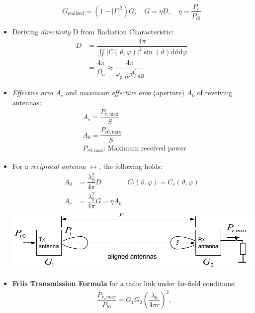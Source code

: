 \begin{itemize}
\begin{align*}
        \end{align*}
        \begin{equation*}
            G_{\mathrm{realized}} = (1 - |\Gamma|^2)G, \quad G = \eta D, \quad \eta = \dfrac{P_t}{P_{t0}}
        \end{equation*}
    \item Deriving \textit{directivity} D from Radiation Characteristic:\\
        \begin{align*}
            D &= \dfrac{4\pi}{\iint |C(\vartheta, \varphi)|^2 \sin(\vartheta) \mathrm{d}\vartheta\mathrm{d}\varphi}\\
            &= \dfrac{4\pi}{\Omega_a} \approx \dfrac{4\pi}{\varphi_{\SI{3}{dB}} \vartheta^\prime_{\SI{3}{dB}}}
        \end{align*}
    \item \textit{Effective area} $A_e$ and \textit{maximum effective area} (aperture) $A_0$ of reveiving antennas:\\
        \begin{align*}
            &A_e = \dfrac{P_{r,\mathrm{max}}}{S}\\
            &A_0 = \dfrac{P_{r0,\mathrm{max}}}{S}\\
            &P_{r0,\mathrm{max}}\text{: Maximum received power}
        \end{align*}
    \item For a \textit{reciprocal antenna} $\leftrightarrow$, the following holds:
        \begin{align*}
            A_0 &= \dfrac{\lambda_0^2}{4\pi} D &C_t(\vartheta, \varphi) = C_r(\vartheta, \varphi)\\
            A_e &= \dfrac{\lambda_0^2}{4\pi} G = \eta A_0&
        \end{align*}
    \includegraphics[width=.3\paperheight]{content/aawp/pictures/friis_transmission.png}
    \item \textbf{Friis Transmission Formula} for a radio link under far-field conditions:
        \begin{align*}
            &\dfrac{P_{r,max}}{P_{t0}} = G_1 G_2 \left(\dfrac{\lambda_0}{4\pi r} \right)^2,\\

\end{align*}
\end{itemize}
